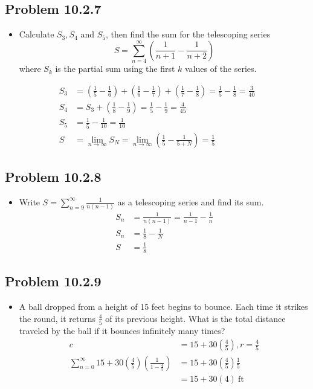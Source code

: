 \begin{itemize}
  \newpage
  \subsection{Problem 10.2.7}
  \begin{itemize}
    \item Calculate \(S_3, S_4\) and \(S_5\), then find the sum for the
      telescoping series
      \[%
        S = \sum_{n=4}^{\infty} \left( \frac{1}{n+1} - \frac{1}{n+2} \right)
      \]%
      where \(S_k\) is the partial sum using the first \(k\) values of the
      series.
  \end{itemize}
  \begin{align*}
    S_3 &= \left(\frac{1}{5} - \frac{1}{6}\right) + \left( \frac{1}{6} - \frac{1}{7} \right) + \left( \frac{1}{7} - \frac{1}{8} \right)
    = \frac{1}{5}-\frac{1}{8} = \frac{3}{40} \\
    S_4 &= S_3 + \left(\frac{1}{8} - \frac{1}{9}\right) = \frac{1}{5} - \frac{1}{9} = \frac{4}{45} \\
    S_5 &= \frac{1}{5} - \frac{1}{10} = \frac{1}{10} \\
    S &= \lim_{n \to \infty} S_N = \lim_{n \to \infty} \left(\frac{1}{5} - \frac{1}{5+N} \right) = \frac{1}{5}
  \end{align*}

  \subsection{Problem 10.2.8}
  \begin{itemize}
    \item Write \(S = \sum_{n=9}^{\infty} \frac{1}{n(n-1)}\) as a telescoping
      series and find its sum.
      \begin{align*}
        S_n &= \frac{1}{n(n-1)} = \frac{1}{n-1} - \frac{1}{n}\\
        S_n &= \frac{1}{8}-\frac{1}{N} \\
        S &= \frac{1}{8}
      \end{align*}
  \end{itemize}

  \subsection{Problem 10.2.9}
  \begin{itemize}
    \item A ball dropped from a height of 15 feet begins to bounce. Each time
      it strikes the round, it returns \(\frac{4}{5}\) of its previous height.
      What is the total distance traveled by the ball if it bounces infinitely
      many times?
      \begin{align*}
        c &= 15 + 30\left(\frac{4}{5}\right), r = \frac{4}{5} \\
        \sum_{n=0}^{\infty} 15 + 30 \left( \frac{4}{5} \right)
        \left(\frac{1}{1-\frac{4}{5}}\right) &= 15+30\left(\frac{4}{5}\right)\frac{1}{5} \\
        &=15+30(4) ~\text{ft}~
      \end{align*}
  \end{itemize}
\end{itemize}

